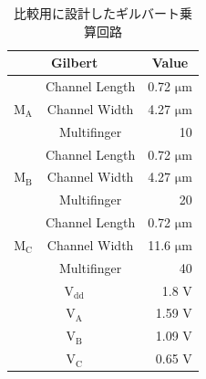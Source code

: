         \begin{table}[!b]
            \begin{minipage}[t]{.45\textwidth}
                \begin{center}
                    \caption{比較用に設計したギルバート乗算回路}
                    \label{table:3_gilbert_param}
                    \begin{tabular}{c|c|r}
                        \hline
                        \multicolumn{2}{c}{Gilbert}   & \multicolumn{1}{c}{Value}     \\
                        \hline\hline
                        &   Channel Length   &   0.72 $\mathrm{\mu m}$   \\
                        \cline{2-3}
                        $\mathrm{M_{A}}$   &   Channel Width   &   4.27 $\mathrm{\mu m}$   \\
                        \cline{2-3}
                            &   Multifinger   & 10    \\
                        \hline
                        &   Channel Length   &   0.72 $\mathrm{\mu m}$   \\
                        \cline{2-3}
                        $\mathrm{M_{B}}$   &   Channel Width   &   4.27 $\mathrm{\mu m}$   \\
                        \cline{2-3}
                            &   Multifinger   & 20    \\
                        \hline
                        &   Channel Length   &   0.72 $\mathrm{\mu m}$   \\
                        \cline{2-3}
                        $\mathrm{M_{C}}$   &   Channel Width   &   11.6 $\mathrm{\mu m}$   \\
                        \cline{2-3}
                            &   Multifinger   & 40    \\
                        \hline
                        \multicolumn{2}{c|}{$\mathrm{V_{dd}}$} &   1.8 $\mathrm{V}$   \\
                        \hline
                        \multicolumn{2}{c|}{$\mathrm{V_{A}}$} &   1.59 $\mathrm{V}$   \\
                        \hline
                        \multicolumn{2}{c|}{$\mathrm{V_{B}}$} &   1.09 $\mathrm{V}$   \\
                        \hline
                        \multicolumn{2}{c|}{$\mathrm{V_{C}}$} &   0.65 $\mathrm{V}$   \\
                        \hline

\end{tabular}
\end{center}
\end{minipage}
\end{table}
